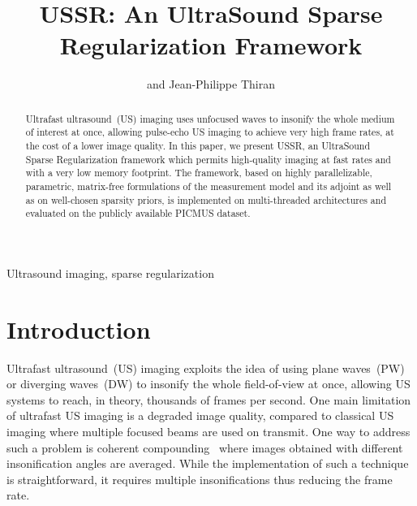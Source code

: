\documentclass[conference]{IEEEtran}
\begin{document}
\title{USSR: An UltraSound Sparse Regularization Framework}


\author{ and 
	Jean-Philippe Thiran
	}
\maketitle

\begin{abstract}
Ultrafast ultrasound~(US) imaging uses unfocused waves to insonify the whole medium of interest at once, allowing pulse-echo US imaging to achieve very high frame rates, at the cost of a lower image quality. In this paper, we present USSR, an UltraSound Sparse Regularization framework which permits high-quality imaging at fast rates and with a very low memory footprint. The framework, based on highly parallelizable, parametric, matrix-free formulations of the measurement model and its adjoint as well as on well-chosen sparsity priors, is implemented on multi-threaded architectures and evaluated on the publicly available PICMUS dataset.  
\end{abstract}

\begin{IEEEkeywords}
Ultrasound imaging, sparse regularization
\end{IEEEkeywords}

\section{Introduction}
\label{sec_introduction}
Ultrafast ultrasound~(US) imaging exploits the idea of using plane waves~(PW) or diverging waves~(DW) to insonify the whole field-of-view at once, allowing US systems to reach, in theory, thousands of frames per second. One main limitation of ultrafast US imaging is a degraded image quality, compared to classical US imaging where multiple focused beams are used on transmit. One way to address such a problem is coherent compounding~\cite{montaldo_uffc_2014} where images obtained with different insonification angles are averaged. While the implementation of such a technique is straightforward, it requires multiple insonifications thus reducing the frame rate.
\end{document}
